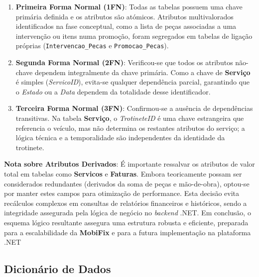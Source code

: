 \documentclass[a4paper,12pt]{scrreprt}
\begin{document}
\begin{enumerate}
    \item \textbf{Primeira Forma Normal (1FN)}: Todas as tabelas possuem uma chave primária definida e os atributos são atómicos. Atributos multivalorados identificados na fase conceptual, como a lista de peças associadas a uma intervenção ou itens numa promoção, foram segregados em tabelas de ligação próprias (\texttt{Intervencao\_Pecas} e \texttt{Promocao\_Pecas}).
    \item \textbf{Segunda Forma Normal (2FN)}: Verificou-se que todos os atributos não-chave dependem integralmente da chave primária. Como a chave de \textbf{Serviço} é simples (\textit{ServicoID}), evita-se qualquer dependência parcial, garantindo que o \textit{Estado} ou a \textit{Data} dependem da totalidade desse identificador.
    \item \textbf{Terceira Forma Normal (3FN)}: Confirmou-se a ausência de dependências transitivas. Na tabela \textbf{Serviço}, o \textit{TrotineteID} é uma chave estrangeira que referencia o veículo, mas não determina os restantes atributos do serviço; a lógica técnica e a temporalidade são independentes da identidade da trotinete.
\end{enumerate}

\textbf{Nota sobre Atributos Derivados}: É importante ressalvar os atributos de valor total em tabelas como \textbf{Servicos} e \textbf{Faturas}. Embora teoricamente possam ser considerados redundantes (derivados da soma de peças e mão-de-obra), optou-se por manter estes campos para otimização de performance. Esta decisão evita recálculos complexos em consultas de relatórios financeiros e históricos, sendo a integridade assegurada pela lógica de negócio no \textit{backend} .NET. Em conclusão, o esquema lógico resultante assegura uma estrutura robusta e eficiente, preparada para a escalabilidade da \textbf{MobiFix} e para a futura implementação na plataforma .NET

\subsection{Dicionário de Dados}
\end{document}

